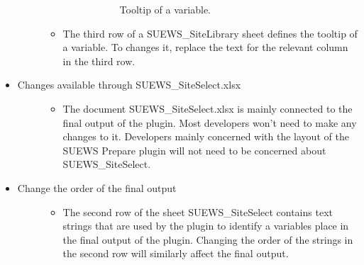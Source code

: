 \documentclass[letterpaper,10pt,english]{sphinxmanual}
\begin{document}
\begin{itemize}
\begin{description}
\begin{itemize}
\begin{description}
\begin{figure}[htbp]
\noindent{}
\caption{Tooltip of a variable.}\label{\detokenize{DevelopmentGuidelines:id8}}\end{figure}

\end{description}

\item {} 
The third row of a SUEWS\_SiteLibrary sheet defines the tooltip of a variable. To changes it, replace the text for the relevant column in the third row.

\end{itemize}

\end{description}

\item {} \begin{description}
\item[{Changes available through SUEWS\_SiteSelect.xlsx}] \leavevmode\begin{itemize}
\item {} 
The document SUEWS\_SiteSelect.xlsx is mainly connected to the final output of the plugin. Most developers won’t need to make any changes to it. Developers mainly concerned with the layout of the SUEWS Prepare plugin will not need to be concerned about SUEWS\_SiteSelect.

\end{itemize}

\end{description}

\item {} \begin{description}
\item[{Change the order of the final output}] \leavevmode\begin{itemize}
\item {} 
The second row of the sheet SUEWS\_SiteSelect contains text strings that are used by the plugin to identify a variables place in the final output of the plugin. Changing the order of the strings in the second row will similarly affect the final output.

\end{itemize}

\end{description}

\end{itemize}
\end{document}
